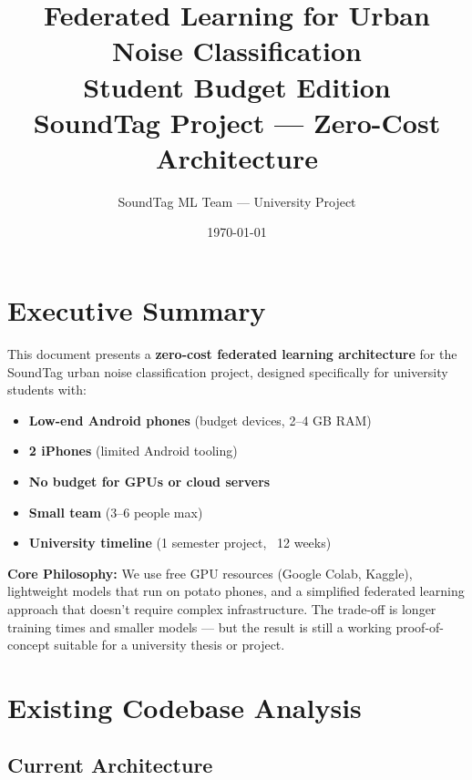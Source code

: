 \documentclass[11pt,a4paper]{article}
\title{\vspace{1.5cm}\Huge\textbf{Federated Learning for Urban Noise Classification} \\ \vspace{0.3cm}\Large\textbf{Student Budget Edition} \\ \vspace{0.5cm}\normalsize SoundTag Project — Zero-Cost Architecture}
\author{SoundTag ML Team — University Project}
\date{\today}
\begin{document}
\maketitle
\thispagestyle{fancy}

\newpage
\tableofcontents
\newpage

\section{Executive Summary}

This document presents a \textbf{zero-cost federated learning architecture} for the SoundTag urban noise classification project, designed specifically for university students with:

\begin{itemize}[leftmargin=*,noitemsep]
    \item \textbf{Low-end Android phones} (budget devices, 2--4 GB RAM)
    \item \textbf{2 iPhones} (limited Android tooling)
    \item \textbf{No budget for GPUs or cloud servers}
    \item \textbf{Small team} (3--6 people max)
    \item \textbf{University timeline} (1 semester project, ~12 weeks)
\end{itemize}

\begin{highlightbox}
\textbf{Core Philosophy:} We use free GPU resources (Google Colab, Kaggle), lightweight models that run on potato phones, and a simplified federated learning approach that doesn't require complex infrastructure. The trade-off is longer training times and smaller models — but the result is still a working proof-of-concept suitable for a university thesis or project.
\end{highlightbox}

\section{Existing Codebase Analysis}

\subsection{Current Architecture}
\end{document}
